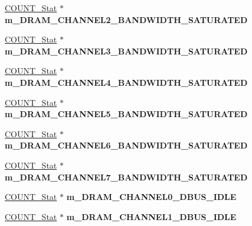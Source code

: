 \begin{DoxyCompactItemize}
\item 
\hypertarget{classall__stats__c_a8586d268e5b9df0180739ec01e6f279f}{
\hyperlink{classCOUNT__Stat}{COUNT\_\-Stat} $\ast$ {\bfseries m\_\-DRAM\_\-CHANNEL2\_\-BANDWIDTH\_\-SATURATED}}
\label{classall__stats__c_a8586d268e5b9df0180739ec01e6f279f}

\item 
\hypertarget{classall__stats__c_a41c649fa49f8911b02a7cd7b189248c8}{
\hyperlink{classCOUNT__Stat}{COUNT\_\-Stat} $\ast$ {\bfseries m\_\-DRAM\_\-CHANNEL3\_\-BANDWIDTH\_\-SATURATED}}
\label{classall__stats__c_a41c649fa49f8911b02a7cd7b189248c8}

\item 
\hypertarget{classall__stats__c_ad67f3ef4c180175213c454d361412442}{
\hyperlink{classCOUNT__Stat}{COUNT\_\-Stat} $\ast$ {\bfseries m\_\-DRAM\_\-CHANNEL4\_\-BANDWIDTH\_\-SATURATED}}
\label{classall__stats__c_ad67f3ef4c180175213c454d361412442}

\item 
\hypertarget{classall__stats__c_a78657a60167d6abff5428095148db1b1}{
\hyperlink{classCOUNT__Stat}{COUNT\_\-Stat} $\ast$ {\bfseries m\_\-DRAM\_\-CHANNEL5\_\-BANDWIDTH\_\-SATURATED}}
\label{classall__stats__c_a78657a60167d6abff5428095148db1b1}

\item 
\hypertarget{classall__stats__c_a30ef3d5a243b993d261f09cad7ceaa39}{
\hyperlink{classCOUNT__Stat}{COUNT\_\-Stat} $\ast$ {\bfseries m\_\-DRAM\_\-CHANNEL6\_\-BANDWIDTH\_\-SATURATED}}
\label{classall__stats__c_a30ef3d5a243b993d261f09cad7ceaa39}

\item 
\hypertarget{classall__stats__c_a69aed774cd88a4de2be4feaf33177b3e}{
\hyperlink{classCOUNT__Stat}{COUNT\_\-Stat} $\ast$ {\bfseries m\_\-DRAM\_\-CHANNEL7\_\-BANDWIDTH\_\-SATURATED}}
\label{classall__stats__c_a69aed774cd88a4de2be4feaf33177b3e}

\item 
\hypertarget{classall__stats__c_afd0e70575a1fbefd4ac666348f48b961}{
\hyperlink{classCOUNT__Stat}{COUNT\_\-Stat} $\ast$ {\bfseries m\_\-DRAM\_\-CHANNEL0\_\-DBUS\_\-IDLE}}
\label{classall__stats__c_afd0e70575a1fbefd4ac666348f48b961}

\item 
\hypertarget{classall__stats__c_a8b804237e54a2198a097b42afd7a4247}{
\hyperlink{classCOUNT__Stat}{COUNT\_\-Stat} $\ast$ {\bfseries m\_\-DRAM\_\-CHANNEL1\_\-DBUS\_\-IDLE}}
\label{classall__stats__c_a8b804237e54a2198a097b42afd7a4247}


\end{DoxyCompactItemize}
